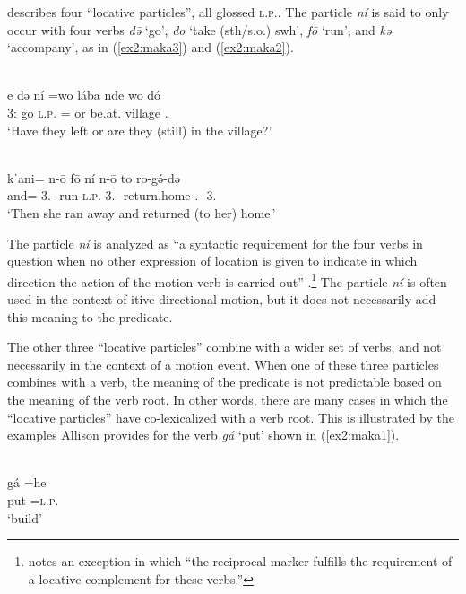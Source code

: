 \citet[239]{allisonGrammarMakaryKotoko2020} describes four ``locative particles'', all glossed \textsc{l.p.}. The particle \textit{ní} is said to only occur with four verbs \textit{də̄} ‘go’, \textit{do} ‘take (sth/s.o.) swh’, \textit{fō} ‘run’, and \textit{kə} ‘accompany', as in (\ref{ex2:maka3}) and (\ref{ex2:maka2}).

\ea\label{ex2:maka3}
 \\
\gll ē də̄ ní =wo lábā nde wo dó \\
3: go \textsc{l.p.} = or be.at. village . \\
\glt `Have they left or are they (still) in the village?'

\ex\label{ex2:maka2}
 \\
\gll kˈani= n-ō fō ní n-ō to ro-gə́-də\\
and= 3.- run \textsc{l.p.} 3.- return.home .--3.		\\
\glt `Then she ran away and returned (to her) home.'
\z 

The particle \textit{ní} is analyzed as ``a syntactic requirement for the four verbs in question when no other expression of location is given to indicate in which direction the action of the motion verb is carried out'' \citep[239]{allisonGrammarMakaryKotoko2020}.\footnote{\citet[267]{allisonGrammarMakaryKotoko2020} notes an exception in which ``the reciprocal marker fulfills the requirement of a locative complement for these verbs.''} The particle \textit{ní} is often used in the context of itive directional motion, but it does not necessarily add this meaning to the predicate. 

The other three ``locative particles'' combine with a wider set of verbs, and not necessarily in the context of a motion event. When one of these three particles combines with a verb, the meaning of the predicate is not predictable based on the meaning of the verb root. In other words, there are many cases in which the ``locative particles'' have co-lexicalized with a verb root. This is illustrated by the examples Allison provides for the verb \textit{gá} ‘put’ shown in (\ref{ex2:maka1}). 

\ea\label{ex2:maka1}
 \\
\ea
\gll  gá =he \\
put =\textsc{l.p.}	\\ 	
\glt `build'

